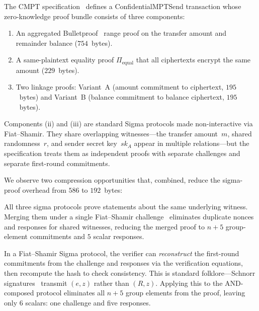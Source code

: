 \documentclass[11pt]{article}
\theoremstyle{definition}
\newcommand{\sk}{\mathit{sk}}
\begin{document}
The CMPT specification~\cite{CenkMalhotraAkinyele2026} defines a
\textsf{ConfidentialMPTSend} transaction whose zero-knowledge proof
bundle consists of three components:
\begin{enumerate}[label=(\roman*)]
  \item An aggregated Bulletproof~\cite{Bunz2018bulletproofs} range
        proof on the transfer amount and remainder balance
        ($754$~bytes).
  \item A same-plaintext equality proof $\Pi_{\mathrm{equal}}$ that all
        ciphertexts encrypt the same amount ($229$~bytes).
  \item Two linkage proofs: Variant~A (amount commitment to ciphertext,
        $195$~bytes) and Variant~B (balance commitment to balance
        ciphertext, $195$~bytes).
\end{enumerate}
Components (ii) and (iii) are standard Sigma protocols made
non-interactive via Fiat--Shamir.
They share overlapping witnesses---the transfer amount~$m$, shared
randomness~$r$, and sender secret key~$\sk_A$ appear in multiple
relations---but the specification treats them as independent proofs
with separate challenges and separate first-round commitments.

We observe two compression opportunities that, combined, reduce the
sigma-proof overhead from $586$ to $192$~bytes:

\begin{description}[style=nextline,leftmargin=1.5em]
  \item[AND-composition.]
    All three sigma protocols prove statements about the same
    underlying witness.
    Merging them under a single Fiat--Shamir
    challenge~\cite{CramerDamgardSchoenmakers1994} eliminates
    duplicate nonces and responses for shared witnesses, reducing
    the merged proof to $n + 5$ group-element commitments
    and $5$ scalar responses.

  \item[Compact (challenge) form.]
    In a Fiat--Shamir Sigma protocol, the verifier can
    \emph{reconstruct} the first-round commitments from the
    challenge and responses via the verification equations, then
    recompute the hash to check consistency.
    This is standard folklore---Schnorr
    signatures~\cite{Schnorr1991} transmit $(e, z)$ rather than
    $(R, z)$.
    Applying this to the AND-composed protocol eliminates all
    $n + 5$ group elements from the proof, leaving only $6$
    scalars: one challenge and five responses.
\end{description}
\end{document}
